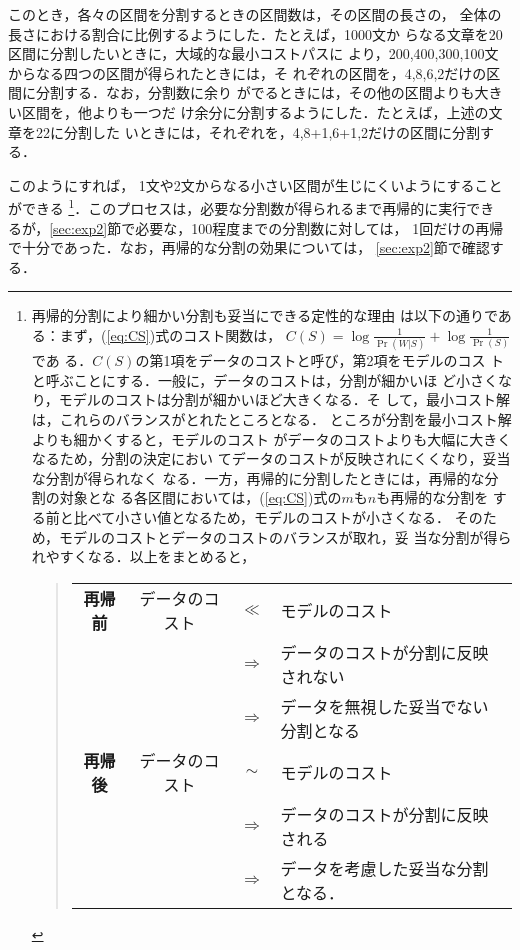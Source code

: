 このとき，各々の区間を分割するときの区間数は，その区間の長さの，
全体の長さにおける割合に比例するようにした．たとえば，1000文か
らなる文章を20区間に分割したいときに，大域的な最小コストパスに
より，200,400,300,100文からなる四つの区間が得られたときには，そ
れぞれの区間を，4,8,6,2だけの区間に分割する．なお，分割数に余り
がでるときには，その他の区間よりも大きい区間を，他よりも一つだ
け余分に分割するようにした．たとえば，上述の文章を22に分割した
いときには，それぞれを，4,8+1,6+1,2だけの区間に分割する．

このようにすれば，
1文や2文からなる小さい区間が生じにくいようにすることができる
\footnote{再帰的分割により細かい分割も妥当にできる定性的な理由
  は以下の通りである：まず，(\ref{eq:CS})式のコスト関数は，
  $C(S) = \log \frac{1}{\Pr(W|S)} + \log \frac{1}{\Pr(S)}$ であ
  る．$C(S)$の第1項をデータのコストと呼び，第2項をモデルのコス
  トと呼ぶことにする．一般に，データのコストは，分割が細かいほ
  ど小さくなり，モデルのコストは分割が細かいほど大きくなる．そ
  して，最小コスト解は，これらのバランスがとれたところとなる．
  ところが分割を最小コスト解よりも細かくすると，モデルのコスト
  がデータのコストよりも大幅に大きくなるため，分割の決定におい
  てデータのコストが反映されにくくなり，妥当な分割が得られなく
  なる．一方，再帰的に分割したときには，再帰的な分割の対象とな
  る各区間においては，(\ref{eq:CS})式の$m$も$n$も再帰的な分割を
  する前と比べて小さい値となるため，モデルのコストが小さくなる．
  そのため，モデルのコストとデータのコストのバランスが取れ，妥
  当な分割が得られやすくなる．以上をまとめると，
  \begin{quote}
    \begin{tabular}{cccl}
      {\bf 再帰前} & データのコスト & $\ll$ & モデルのコスト\\
      &                & $\Rightarrow$ & データのコストが分割に反映されない \\
      &                & $\Rightarrow$ & データを無視した妥当でない分割となる\\
      {\bf 再帰後} & データのコスト & $\sim$ & モデルのコスト\\
      &                & $\Rightarrow$ & データのコストが分割に反映される\\
      &                & $\Rightarrow$ & データを考慮した妥当な分割となる．
    \end{tabular}
  \end{quote}
  }．このプロセスは，必要な分割数が得られるまで再帰的に実行でき
るが，\ref{sec:exp2}節で必要な，100程度までの分割数に対しては，
1回だけの再帰で十分であった．なお，再帰的な分割の効果については，
\ref{sec:exp2}節で確認する．

